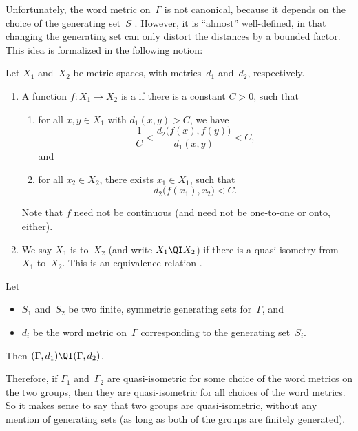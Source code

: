 Unfortunately, the word metric on~$\Gamma$ is not canonical, because it depends on the choice of the generating set~$S$ . However, it is ``almost'' well-defined, in that changing the generating set can only distort the distances by a bounded factor. This idea is formalized in the following notion:

\begin{defn} \label{QuasiIsomDefn}
 Let $X_1$ and~$X_2$ be metric spaces, with metrics~$d_1$ and~$d_2$, respectively. 
 	\begin{enumerate}
	\item A function $f \colon X_1 \to X_2$ is a  if there is a constant $C > 0$, such that
		 \begin{enumerate}
		 \item
		 for all $x,y \in X_1$ with $d_1(x,y) > C$,
		we have
		 $$ \frac{1}{C}
		 < \frac{ d_2 \bigl( f(x), f(y) \bigr) }
		 { d_1 ( x, y) }
		 < C ,$$ and
		 \item for all $x_2 \in X_2$, there exists $x_1 \in
		X_1$, such that 
			$$d_2 \bigl( f(x_1), x_2 \bigr) < C .$$
		 \end{enumerate}
 	Note that $f$ need not be continuous (and need not be one-to-one or onto, either).
	
	\item We say $X_1$ is  to~$X_2$ (and write $X_1 \QI X_2$) if there is a quasi-isometry from~$X_1$ to~$X_2$. This is an equivalence relation .
	\end{enumerate}
 \end{defn}

\begin{prop} \label{WordWellDef}
Let 
	\begin{itemize}
	\item $S_1$ and~$S_2$ be two finite, symmetric generating sets for~$\Gamma$,
	and
	\item $d_i$ be the word metric on~$\Gamma$ corresponding to the generating set~$S_i$.
	\end{itemize}
Then $(\Gamma,d_1) \QI (\Gamma,d_2)$.
\end{prop}

Therefore, if $\Gamma_1$ and~$\Gamma_2$ are quasi-isometric for some choice of the word metrics on the two groups, then they are quasi-isometric for all choices of the word metrics. So it makes sense to say that two groups are quasi-isometric, without any mention of generating sets (as long as both of the groups are finitely generated).

